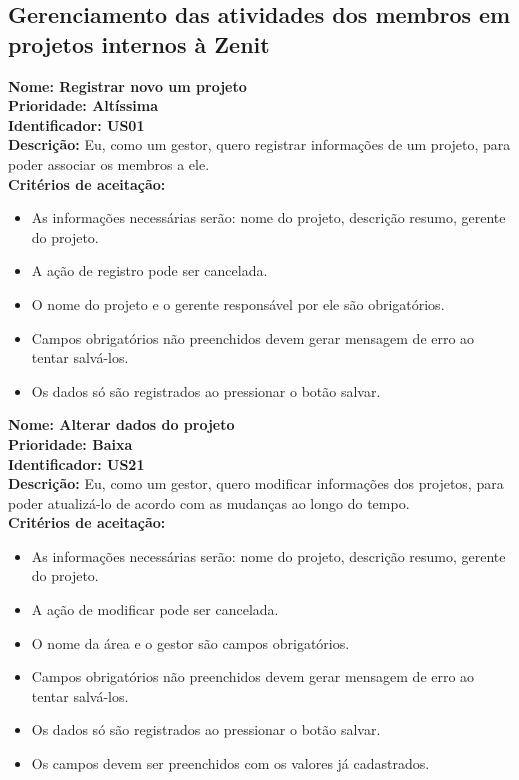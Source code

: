 \begin{anexosenv}
\subsection{Gerenciamento das atividades dos membros em projetos internos à Zenit}
\textbf{Nome: Registrar novo um projeto\\
    Prioridade:  Altíssima\\
    Identificador: US01\\
    Descrição:} Eu, como um gestor, quero registrar informações de um projeto, para poder associar os membros a ele.\\
\textbf{Critérios de aceitação:}
\begin{itemize}
    \item As informações necessárias serão: nome do projeto, descrição resumo, gerente do projeto.
    \item A ação de registro pode ser cancelada.
    \item O nome do projeto e o gerente responsável por ele são obrigatórios.
    \item Campos obrigatórios não preenchidos devem gerar mensagem de erro ao tentar salvá-los.
    \item Os dados só são registrados ao pressionar o botão salvar.
\end{itemize}


\textbf{Nome: Alterar dados do projeto\\
    Prioridade: Baixa\\
    Identificador: US21\\
    Descrição:} Eu, como um gestor, quero modificar informações dos projetos, para poder atualizá-lo de acordo com as mudanças ao longo do tempo.\\
\textbf{Critérios de aceitação:}
\begin{itemize}
    \item As informações necessárias serão: nome do projeto, descrição resumo, gerente do projeto.
    \item A ação de modificar pode ser cancelada.
    \item O nome da área e o gestor são campos obrigatórios.
    \item Campos obrigatórios não preenchidos devem gerar mensagem de erro ao tentar salvá-los.
    \item Os dados só são registrados ao pressionar o botão salvar.
    \item Os campos devem ser preenchidos com os valores já cadastrados.
\end{itemize}



\end{anexosenv}
